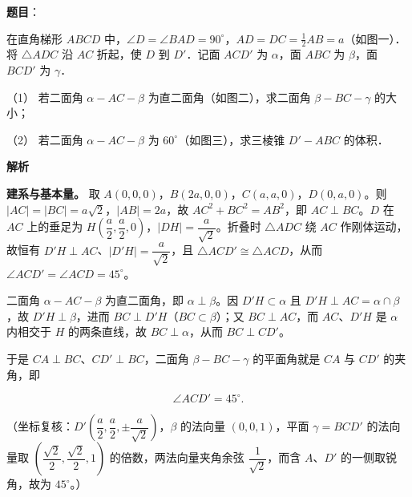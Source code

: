\begin{answer}

\textbf{题目}：

在直角梯形 $ABCD$ 中，$\angle D = \angle BAD = 90^\circ$，$AD = DC = \frac{1}{2}AB = a$（如图一）．将 $\triangle ADC$ 沿 $AC$ 折起，使 $D$ 到 $D'$．记面 $ACD'$ 为 $\alpha$，面 $ABC$ 为 $\beta$，面 $BCD'$ 为 $\gamma$．

（1） 若二面角 $\alpha-AC-\beta$ 为直二面角（如图二），求二面角 $\beta-BC-\gamma$ 的大小；

（2） 若二面角 $\alpha-AC-\beta$ 为 $60^\circ$（如图三），求三棱锥 $D'-ABC$ 的体积．
\nopagebreak[4]
\begin{center}\end{center}
\nopagebreak[4]
\nopagebreak[4]
\begin{center}\end{center}
\nopagebreak[4]
\nopagebreak[4]
\begin{center}\end{center}
\nopagebreak[4]
\textbf{解析}

\textbf{建系与基本量。} 取 $A(0,0,0)$，$B(2a,0,0)$，$C(a,a,0)$，$D(0,a,0)$。则 $|AC|=|BC|=a\sqrt2$，$|AB|=2a$，故 $AC^2+BC^2=AB^2$，即 $AC\perp BC$。$D$ 在 $AC$ 上的垂足为 $H\left(\dfrac a2,\dfrac a2,0\right)$，$|DH|=\dfrac{a}{\sqrt2}$。折叠时 $\triangle ADC$ 绕 $AC$ 作刚体运动，故恒有 $D'H\perp AC$、$|D'H|=\dfrac{a}{\sqrt2}$，且 $\triangle ACD'\cong\triangle ACD$，从而 $\angle ACD'=\angle ACD=45^\circ$。


二面角 $\alpha-AC-\beta$ 为直二面角，即 $\alpha\perp\beta$。因 $D'H\subset\alpha$ 且 $D'H\perp AC=\alpha\cap\beta$，故 $D'H\perp\beta$，进而 $BC\perp D'H$（$BC\subset\beta$）；又 $BC\perp AC$，而 $AC$、$D'H$ 是 $\alpha$ 内相交于 $H$ 的两条直线，故 $BC\perp\alpha$，从而 $BC\perp CD'$。

于是 $CA\perp BC$、$CD'\perp BC$，二面角 $\beta-BC-\gamma$ 的平面角就是 $CA$ 与 $CD'$ 的夹角，即

\nopagebreak[4]
\[\angle ACD'=45^\circ .\]

（坐标复核：$D'\left(\dfrac a2,\dfrac a2,\pm\dfrac{a}{\sqrt2}\right)$，$\beta$ 的法向量 $(0,0,1)$，平面 $\gamma=BCD'$ 的法向量取 $\left(\dfrac{\sqrt2}{2},\dfrac{\sqrt2}{2},1\right)$ 的倍数，两法向量夹角余弦 $\dfrac{1}{\sqrt2}$，而含 $A$、$D'$ 的一侧取锐角，故为 $45^\circ$。）


\end{answer}
